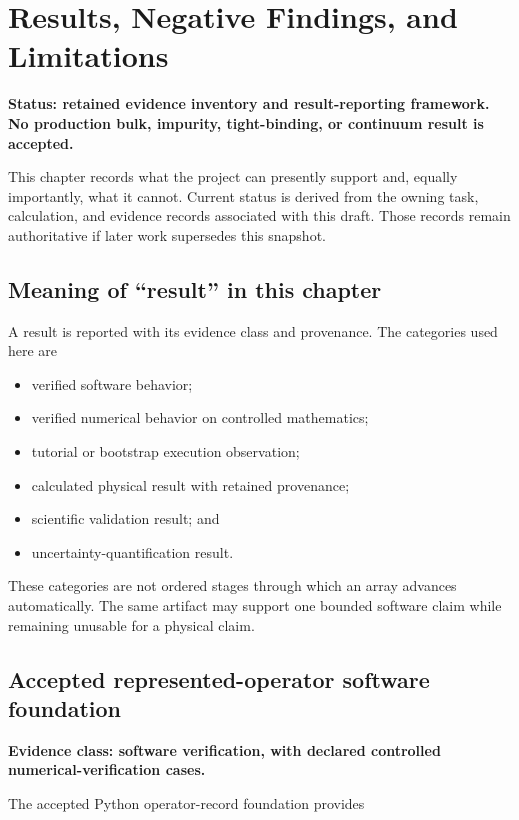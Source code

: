 \chapter{Results, Negative Findings, and Limitations}
\label{ch:results-and-limitations}

\textbf{Status: retained evidence inventory and result-reporting framework. No
production bulk, impurity, tight-binding, or continuum result is accepted.}

This chapter records what the project can presently support and, equally
importantly, what it cannot. Current status is derived from the owning task,
calculation, and evidence records associated with this draft. Those records
remain authoritative if later work supersedes this snapshot.

\section{Meaning of ``result'' in this chapter}

A result is reported with its evidence class and provenance. The categories used
here are

\begin{itemize}
  \item verified software behavior;
  \item verified numerical behavior on controlled mathematics;
  \item tutorial or bootstrap execution observation;
  \item calculated physical result with retained provenance;
  \item scientific validation result; and
  \item uncertainty-quantification result.
\end{itemize}

These categories are not ordered stages through which an array advances
automatically. The same artifact may support one bounded software claim while
remaining unusable for a physical claim.

\section{Accepted represented-operator software foundation}

\textbf{Evidence class: software verification, with declared controlled
numerical-verification cases.}

The accepted Python operator-record foundation provides


